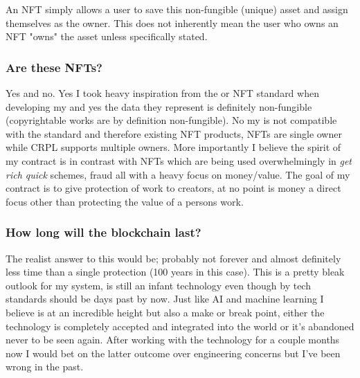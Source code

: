 An NFT  simply allows a user to save this non-fungible (unique) asset and assign themselves as the owner. This does not inherently mean the user who owns an NFT "owns" the asset unless specifically stated.

\subsubsection{Are these NFTs?}

Yes and no.
\br
Yes I took heavy inspiration from the \nft or NFT standard when developing my  and yes the data they represent is definitely non-fungible (copyrightable works are by definition non-fungible).
\br
No my  is not compatible with the \nft standard and therefore existing NFT products, NFTs are single owner while CRPL supports multiple owners. More importantly I believe the spirit of my contract is in contrast with NFTs which are being used overwhelmingly in \textit{get rich quick} schemes, fraud all with a heavy focus on money/value. The goal of my contract is to give protection of work to creators, at no point is money a direct focus other than protecting the value of a persons work. 

\subsubsection{How long will the blockchain last?}

The realist answer to this would be; probably not forever and almost definitely less time than a single  protection (100 years in this case). This is a pretty bleak outlook for my system,  is still an infant technology even though by tech standards should be days past by now. Just like AI and machine learning I believe  is at an incredible height but also a make or break point, either the technology is completely accepted and integrated into the world or it's abandoned never to be seen again. After working with the technology for a couple months now I would bet on the latter outcome over engineering concerns but I've been wrong in the past.
